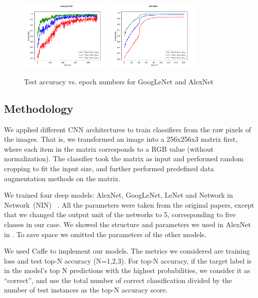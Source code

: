 \begin{figure}[t]
\centering
\includegraphics[width=0.4\textwidth]{google_acc.png}
\includegraphics[width=0.4\textwidth]{alex_acc.png}
\caption{Test accuracy vs. epoch numbers for GoogLeNet and AlexNet }
\label{cnn_acc}
\end{figure}

\subsection{Methodology}

We applied different CNN architectures to train 
classifiers from the raw pixels of the images. That is, we transformed  
an image into a 256x256x3 matrix first, where each item in the matrix corresponds 
to a RGB value (without normalization). The classifier took the matrix as input and performed random cropping to fit the input size, 
and further performed predefined data augmentation methods on the matrix. 

We trained four deep models: AlexNet, GoogLeNet, LeNet and Network in Network~(NIN)~
\cite{nin,GoogleNet,LeNet,AlexNet}.
All the parameters were taken from the original papers, except that
we changed the output unit of the networks to 5, corresponding to five classes 
in our case. We showed the structure and parameters we used in AlexNet in . 
To save space we omitted the parameters of the other models. 

We used Caffe to implement our models. The metrics we considered are training loss 
and test top-N accuracy (N=1,2,3). For top-N accuracy, 
if the target label is in the model's top N predictions with the highest probabilities, 
we consider it as ``correct'', and use the total number of correct classification 
divided by the number of test instances as the top-N accuracy score. 


